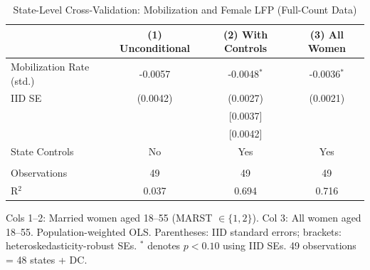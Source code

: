 
\begin{table}[htbp]
   \caption{\label{tab:statelevel} State-Level Cross-Validation: Mobilization and Female LFP (Full-Count Data)}
   \bigskip
   \centering
   \begin{tabular}{lccc}
      \toprule
                               & (1) Unconditional & (2) With Controls & (3) All Women \\
      \midrule 
      Mobilization Rate (std.) & -0.0057           & -0.0048$^{*}$     & -0.0036$^{*}$\\
      \quad IID SE              & (0.0042)          & (0.0027)          & (0.0021)\\
      \quad [HC2 SE]            &                   & [0.0037]          &\\
      \quad [HC3 SE]            &                   & [0.0042]          &\\
      State Controls           & No                & Yes               & Yes\\
       \\
      Observations             & 49                & 49                & 49\\
      R$^2$                    & 0.037             & 0.694             & 0.716\\
      \bottomrule
   \end{tabular}

   \par \raggedright \footnotesize
   Cols 1--2: Married women aged 18--55 (MARST $\in \{1,2\}$). Col 3: All women aged 18--55. Population-weighted OLS. Parentheses: IID standard errors; brackets: heteroskedasticity-robust SEs. $^{*}$ denotes $p < 0.10$ using IID SEs. 49 observations = 48 states + DC.
\end{table}


